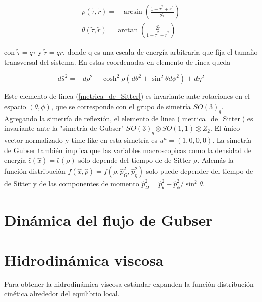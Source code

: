 \documentclass[11pt,a4paper]{article}
\begin{document}
\begin{subequations}
\begin{align}
\rho(\tilde{\tau},\tilde{r})=-\arcsin(\frac{1-{\tilde{\tau}}^2+{\tilde{r}}^2}{2\tilde{\tau}})\\
\theta(\tilde{\tau},\tilde{r})=\arctan(\frac{2\tilde{r}}{1+{\tilde{\tau}}^2-{\tilde{r}}^2})
\end{align}
\label{cambio_de_coordenadas}
\end{subequations}

con $\tilde{\tau}=q\tau$ y $\tilde{r}=qr$, donde q es una escala de energía arbitraria que fija el tamaño transversal del sistema. En estas coordenadas en elemento de linea queda



\begin{equation}
d\hat{s}^2=-d{\rho}^2+\cosh^2{\rho}(d{\theta}^2+\sin^2{\theta}d{\phi}^2)+d{\eta}^2
\label{metrica_de_Sitter}
\end{equation}

Este elemento de linea (\ref{metrica_de_Sitter}) es invariante ante rotaciones en el espacio $(\theta,\phi)$, que se corresponde con el grupo de simetría $SO(3)_q$. Agregando la simetría de reflexión, el elemento de linea (\ref{metrica_de_Sitter}) es invariante ante la "simetría de Gubser" $SO(3)_{q}{\otimes}SO(1,1){\otimes}Z_{2}$. El único vector normalizado y time-like en esta simetría es $u^{\mu}=(1,0,0,0)$.
La simetría de Gubser también implica que las variables macroscopicas como la densidad de energía $\hat{\epsilon}(\hat{x})=\hat{\epsilon}(\rho)$ sólo depende del tiempo de de Sitter $\rho$. Además la función distribución $f( \hat{x}, \hat{p})=f( \rho, \hat{p}^2_{\Omega},\hat{p}^2_{\eta})$ solo puede depender del tiempo de de Sitter y de las componentes de momento $\hat{p}^2_{\Omega}=\hat{p}^2_{\theta}+\hat{p}^2_{\phi}/\sin^2\theta$.

\section{Dinámica del flujo de Gubser}




\section{Hidrodinámica viscosa}

Para obtener la hidrodinámica viscosa estándar expanden la función distribución cinética alrededor del equilibrio local.
\end{document}
